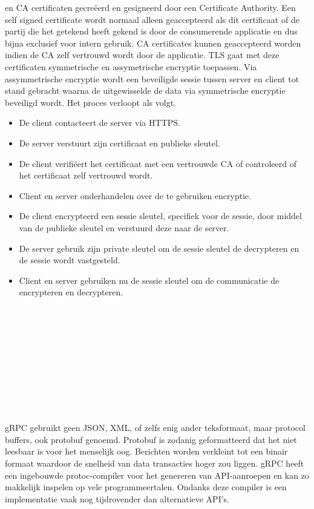 en CA certificaten gecre\"eerd en gesigneerd door een Certificate Authority. Een self signed certificate wordt normaal alleen geaccepteerd als dit certificaat of de
partij die het getekend heeft gekend is door de consumerende applicatie en dus bijna exclusief voor intern gebruik. CA certificates kunnen geaccepteerd worden indien de
CA zelf vertrouwd wordt door de applicatie.\newline
TLS gaat met deze certificaten symmetrische en assymetrische encryptie toepassen. Via assymmetrische encryptie wordt een beveiligde sessie tussen server en client tot
stand gebracht waarna de uitgewisselde de data via symmetrische encryptie beveiligd wordt. Het proces verloopt als volgt.
\begin{itemize}
    \item De client contacteert de server via HTTPS.
    \item De server verstuurt zijn certificaat en publieke sleutel.
    \item De client verifi\"eert het certificaat met een vertrouwde CA of controleerd of het certificaat zelf vertrouwd wordt.
    \item Client en server onderhandelen over de te gebruiken encryptie.
    \item De client encrypteerd een sessie sleutel, specifiek voor de sessie, door middel van de publieke sleutel en verstuurd deze naar de server.
    \item De server gebruik zijn private sleutel om de sessie sleutel de decrypteren en de sessie wordt vastgesteld.
    \item Client en server gebruiken nu de sessie sleutel om de communicatie de encrypteren en decrypteren.
\end{itemize}
~\autocite{githubhttp2}\\
~\autocite{sslcomhttp2tls}\\
~\autocite{browserhttp2support}\\
~\autocite{tlsBasics}\\
~\autocite{grpctls}\\
~\autocite{http11vshttp2}\\
~\autocite{tlsperformance}\\
~\autocite{sslcertificate}\\
~\autocite{sslhandshake}

gRPC gebruikt geen JSON, XML, of zelfs enig ander teksformaat, maar protocol buffers, ook protobuf genoemd. Protobuf is zodanig geformatteerd dat het niet leesbaar is
voor het menselijk oog. Berichten worden verkleint tot een binair formaat waardoor de snelheid van data transacties hoger zou liggen. gRPC heeft een ingebouwde
protoc-compiler voor het genereren van API-aanroepen en kan zo makkelijk inspelen op vele programmeertalen.
Ondanks deze compiler is een implementatie vaak nog tijdrovender dan alternatieve API's.\newline
~\autocite{googleprotobufguide}\\
~\autocite{dreamfactory}\\

